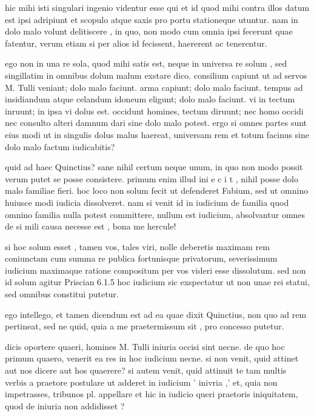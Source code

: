  hic mihi isti singulari ingenio videntur esse qui et id quod mihi contra illos datum est ipsi adripiunt et scopulo atque saxis pro portu stationeque utuntur. nam in dolo malo volunt delitiscere , in quo, non modo cum omnia ipsi fecerunt quae fatentur, verum etiam si per alios id fecissent, haererent ac tenerentur.

 ego non in una re sola, quod mihi satis est, neque in universa re solum , sed singillatim in omnibus dolum malum exstare dico. consilium capiunt ut ad servos M. Tulli veniant; dolo malo faciunt. arma capiunt; dolo malo faciunt. tempus ad insidiandum atque celandum idoneum eligunt; dolo malo faciunt. vi in tectum inruunt; in ipsa vi dolus est. occidunt homines, tectum diruunt; nec homo occidi nec consulto alteri damnum dari sine dolo malo potest. ergo si omnes partes sunt eius modi ut in singulis dolus malus haereat, universam rem et totum facinus sine dolo malo factum iudicabitis?

 quid ad haec Quinctius? sane nihil certum neque unum, in quo non modo possit verum putet se posse consistere. primum enim illud ini e c i t , nihil posse dolo malo familiae fieri. hoc loco non solum fecit ut defenderet Fabium, sed ut omnino huiusce modi iudicia dissolveret. nam si venit id in iudicium de familia quod omnino familia nulla potest committere, nullum est iudicium, absolvantur omnes de si mili causa necesse est , bona me hercule!

 si hoc solum esset , tamen vos, tales viri, nolle deberetis maximam rem coniunctam cum summa re publica fortunisque privatorum, severissimum iudicium maximaque ratione compositum per vos videri esse dissolutum. sed non id solum agitur Priscian 6.1.5 hoc iudicium sic exspectatur ut non unae rei statui, sed omnibus constitui putetur.

 ego intellego, et tamen dicendum est ad ea quae dixit Quinctius, non quo ad rem pertineat, sed ne quid, quia a me praetermissum sit , pro concesso putetur.

 dicis oportere quaeri, homines M. Tulli iniuria occisi sint necne. de quo hoc primum quaero, venerit ea res in hoc iudicium necne. si non venit, quid attinet aut nos dicere aut hos quaerere? si autem venit, quid attinuit te tam multis verbis a praetore postulare ut adderet in iudicium ' inivria ,' et, quia non impetrasses, tribunos pl. appellare et hic in iudicio queri praetoris iniquitatem, quod de iniuria non addidisset ?

